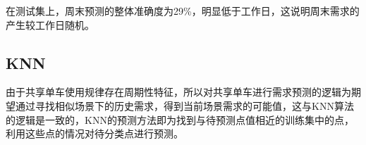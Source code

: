 \documentclass[]{tongjithesis}
\numberwithin{equation}{chapter}
\begin{document}
在测试集上，周末预测的整体准确度为29\%，明显低于工作日，这说明周末需求的产生较工作日随机。

\subsection{KNN}
由于共享单车使用规律存在周期性特征，所以对共享单车进行需求预测的逻辑为期望通过寻找相似场景下的历史需求，得到当前场景需求的可能值，这与KNN算法的逻辑是一致的，KNN的预测方法即为找到与待预测点值相近的训练集中的点，利用这些点的情况对待分类点进行预测。
\end{document}
